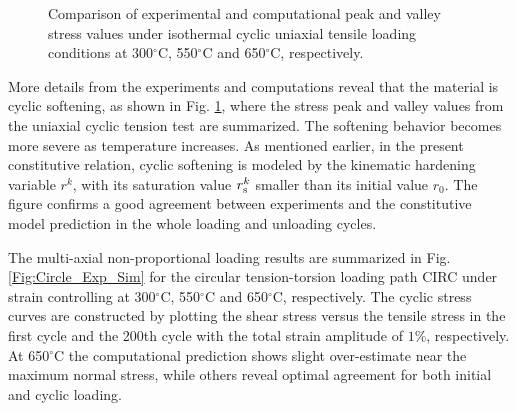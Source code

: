 \documentclass[preprint,5p,twocolumn,11pt,sort&compress]{elsarticle}
\begin{document}
\begin{figure}
\caption{Comparison of experimental and computational peak and valley stress values under isothermal cyclic uniaxial tensile loading conditions at 300$^{\circ}$C, 550$^{\circ}$C and 650$^{\circ}$C, respectively.}
\label{Fig:Compare_PACC-PV_stress_temperature}
\end{figure}


\begin{figure*}[!]
\caption{Comparison between experiments and computations  for the isothermal non-proportional cyclic loading path CIRC at  300, 550, 650$^{\circ}$C, respectively. (a) The first loading cycle. (b) The 200th cycle.}
\label{Fig:Circle_Exp_Sim}
\end{figure*}


More details from the experiments and computations reveal that the material is cyclic softening, as shown in Fig. \ref{Fig:Compare_PACC-PV_stress_temperature}, where the stress peak and valley values from the uniaxial cyclic tension test are summarized. The softening behavior becomes more severe as temperature increases.
As mentioned earlier, in the present constitutive relation, cyclic softening is modeled by the kinematic hardening variable $r^k$, with its saturation value $r_{\rm s}^k$ smaller than its initial value $r_0$.
The figure confirms a good agreement between experiments and the constitutive model prediction in the whole loading and unloading cycles.


The multi-axial non-proportional loading results are summarized in Fig. \ref{Fig:Circle_Exp_Sim} for the circular tension-torsion loading path CIRC under strain controlling at 300$^{\circ}$C, 550$^{\circ}$C and 650$^{\circ}$C, respectively. The cyclic stress curves are constructed by plotting the shear stress versus the tensile stress in the first cycle and the 200th cycle with the total strain amplitude of $1\%$, respectively. At 650$^{\circ}$C the computational prediction shows slight over-estimate near the maximum normal stress, while others reveal optimal agreement for both initial and cyclic loading.
\end{document}
